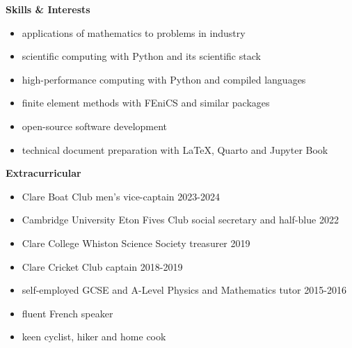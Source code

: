 \documentclass[10pt]{article}
\begin{document}
\textbf{Skills \& Interests}
\begin{itemize}[noitemsep]
\item applications of mathematics to problems in industry
\item scientific computing with Python and its scientific stack
\item high-performance computing with Python and compiled languages
\item finite element methods with FEniCS and similar packages
\item open-source software development
\item technical document preparation with \LaTeX, Quarto and Jupyter Book
\end{itemize}

\textbf{Extracurricular}
\begin{itemize}[noitemsep]
\item Clare Boat Club men's vice-captain 2023-2024
\item Cambridge University Eton Fives Club social secretary and half-blue 2022
\item Clare College Whiston Science Society treasurer 2019
\item Clare Cricket Club captain 2018-2019
\item self-employed GCSE and A-Level Physics and Mathematics tutor 2015-2016
\item fluent French speaker
\item keen cyclist, hiker and home cook
\end{itemize}
\end{document}
